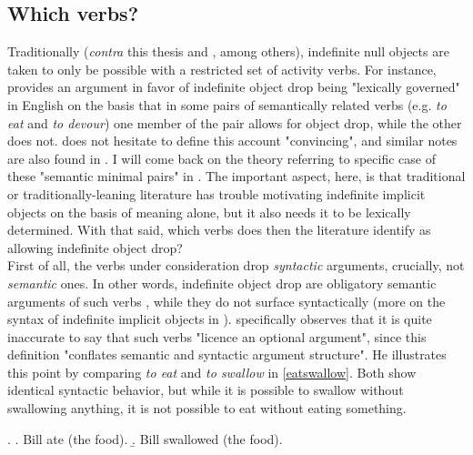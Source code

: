 
\subsection{Which verbs?}

Traditionally (\textit{contra} this thesis and \textcite[55]{TonelliDelmonte2011}, among others), indefinite null objects are taken to only be possible with a restricted set of activity verbs. For instance, \textcite[510]{Rizzi1986} provides an argument in favor of indefinite object drop being "lexically governed" in English on the basis that in some pairs of semantically related verbs (e.g. \textit{to eat} and \textit{to devour}) one member of the pair allows for object drop, while the other does not. \textcite[236]{Haegeman1987} does not hesitate to define this account "convincing", and similar notes are also found in \textcite{Fillmore1986, Rice1988, Mittwoch2005, Gillon2012}. I will come back on the theory referring to specific case of these "semantic minimal pairs" in . The important aspect, here, is that traditional or traditionally-leaning literature has trouble motivating indefinite implicit objects on the basis of meaning alone, but it also needs it to be lexically determined. With that said, which verbs does then the literature identify as allowing indefinite object drop?\\
First of all, the verbs under consideration drop \textit{syntactic} arguments, crucially, not \textit{semantic} ones. In other words, indefinite object drop are obligatory semantic arguments of such verbs \parencite[120]{Cote1996}, while they do not surface syntactically (more on the syntax of indefinite implicit objects in ). \textcite[134]{Jackendoff2003} specifically observes that it is quite inaccurate to say that such verbs "licence an optional argument", since this definition "conflates semantic and syntactic argument structure". He illustrates this point by comparing \textit{to eat} and \textit{to swallow} in \ref{eatswallow}. Both show identical syntactic behavior, but while it is possible to swallow without swallowing anything, it is not possible to eat without eating something.

\ex. \label{eatswallow} \a. \label{eatswallow1} Bill ate (the food).
\b. \label{eatswallow2} Bill swallowed (the food).

